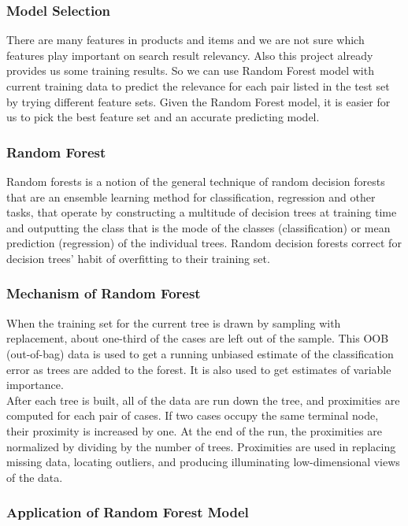 \documentclass{sig-alternate-05-2015}
\begin{document}
\subsubsection{Model Selection}
There are many features in products and items and we are not sure which features play important on search result relevancy. Also this project already provides us some training results. So we can use Random Forest model with current training data to predict the relevance for each pair listed in the test set by trying different feature sets. Given the Random Forest model, it is easier for us to pick the best feature set and an accurate predicting model.

\subsubsection{Random Forest}
Random forests is a notion of the general technique of random decision  
forests that are an ensemble learning method for classification, regression and 
other tasks, that operate by constructing a multitude of decision trees at training time and outputting the class that is the mode of the classes (classification) or mean prediction (regression) of the individual trees. Random decision forests correct for decision trees' habit of overfitting to their training set.

\subsubsection{Mechanism of Random Forest}
When the training set for the current tree is drawn by sampling with replacement, about one-third of the cases are left out of the sample. This OOB (out-of-bag) data is used to get a running unbiased estimate of the classification error as trees are added to the forest. It is also used to get estimates of variable importance.\\

After each tree is built, all of the data are run down the tree, and proximities are computed for each pair of cases. If two cases occupy the same terminal node, their proximity is increased by one. At the end of the run, the proximities are normalized by dividing by the number of trees. Proximities are used in replacing missing data, locating outliers, and producing illuminating low-dimensional views of the data.

\subsubsection{Application of Random Forest Model}
\end{document}
